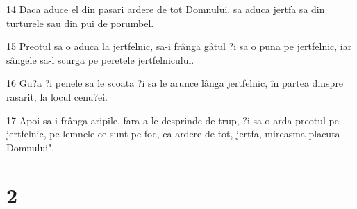 \par 14 Daca aduce el din pasari ardere de tot Domnului, sa aduca jertfa sa din turturele sau din pui de porumbel.
\par 15 Preotul sa o aduca la jertfelnic, sa-i frânga gâtul ?i sa o puna pe jertfelnic, iar sângele sa-l scurga pe peretele jertfelnicului.
\par 16 Gu?a ?i penele sa le scoata ?i sa le arunce lânga jertfelnic, în partea dinspre rasarit, la locul cenu?ei.
\par 17 Apoi sa-i frânga aripile, fara a le desprinde de trup, ?i sa o arda preotul pe jertfelnic, pe lemnele ce sunt pe foc, ca ardere de tot, jertfa, mireasma placuta Domnului".

\chapter{2}

